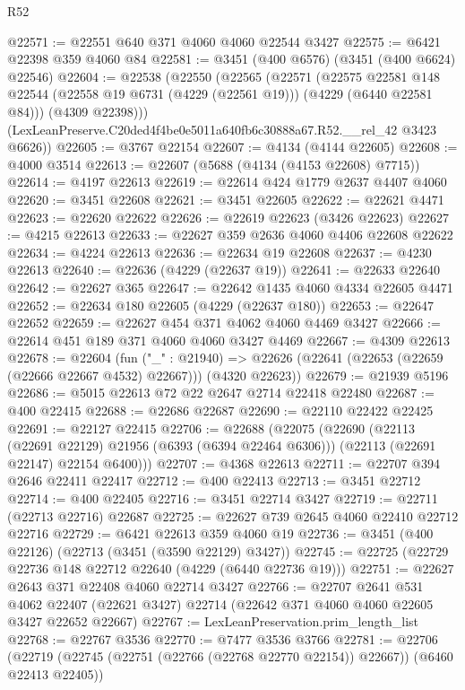 \begin{lexlean}{R52}
\begin{coremodule}
@22571 := @22551 @640 @371 @4060 @4060 @22544 @3427
@22575 := @6421 @22398 @359 @4060 @84
@22581 := @3451 (@400 @6576) (@3451 (@400 @6624) @22546)
@22604 := @22538
    (@22550
      (@22565
        (@22571
          (@22575
            @22581
            @148
            @22544
            (@22558 @19 @6731 (@4229 (@22561 @19)))
            (@4229 (@6440 @22581 @84)))
          (@4309 @22398)))
      (LexLeanPreserve.C20ded4f4be0e5011a640fb6c30888a67.R52.__rel_42 @3423 @6626))
@22605 := @3767 @22154
@22607 := @4134 (@4144 @22605)
@22608 := @4000 @3514
@22613 := @22607 (@5688 (@4134 (@4153 @22608) @7715))
@22614 := @4197 @22613
@22619 := @22614 @424 @1779 @2637 @4407 @4060
@22620 := @3451 @22608
@22621 := @3451 @22605
@22622 := @22621 @4471
@22623 := @22620 @22622
@22626 := @22619 @22623 (@3426 @22623)
@22627 := @4215 @22613
@22633 := @22627 @359 @2636 @4060 @4406 @22608 @22622
@22634 := @4224 @22613
@22636 := @22634 @19 @22608
@22637 := @4230 @22613
@22640 := @22636 (@4229 (@22637 @19))
@22641 := @22633 @22640
@22642 := @22627 @365
@22647 := @22642 @1435 @4060 @4334 @22605 @4471
@22652 := @22634 @180 @22605 (@4229 (@22637 @180))
@22653 := @22647 @22652
@22659 := @22627 @454 @371 @4062 @4060 @4469 @3427
@22666 := @22614 @451 @189 @371 @4060 @4060 @3427 @4469
@22667 := @4309 @22613
@22678 := @22604
    (fun ("_" : @21940) =>
    @22626 (@22641 (@22653 (@22659 (@22666 @22667 @4532) @22667))) (@4320 @22623))
@22679 := @21939 @5196
@22686 := @5015 @22613 @72 @22 @2647 @2714 @22418 @22480
@22687 := @400 @22415
@22688 := @22686 @22687
@22690 := @22110 @22422 @22425
@22691 := @22127 @22415
@22706 := @22688
    (@22075
      (@22690
        (@22113 (@22691 @22129) @21956 (@6393 (@6394 @22464 @6306)))
        (@22113 (@22691 @22147) @22154 @6400)))
@22707 := @4368 @22613
@22711 := @22707 @394 @2646 @22411 @22417
@22712 := @400 @22413
@22713 := @3451 @22712
@22714 := @400 @22405
@22716 := @3451 @22714 @3427
@22719 := @22711 (@22713 @22716) @22687
@22725 := @22627 @739 @2645 @4060 @22410 @22712 @22716
@22729 := @6421 @22613 @359 @4060 @19
@22736 := @3451 (@400 @22126) (@22713 (@3451 (@3590 @22129) @3427))
@22745 := @22725 (@22729 @22736 @148 @22712 @22640 (@4229 (@6440 @22736 @19)))
@22751 := @22627 @2643 @371 @22408 @4060 @22714 @3427
@22766 := @22707
    @2641
    @531
    @4062
    @22407
    (@22621 @3427)
    @22714
    (@22642 @371 @4060 @4060 @22605 @3427 @22652 @22667)
@22767 := LexLeanPreservation.prim_length_list
@22768 := @22767 @3536
@22770 := @7477 @3536 @3766
@22781 := @22706
    (@22719 (@22745 (@22751 (@22766 (@22768 @22770 @22154)) @22667)) (@6460 @22413 @22405))

\end{coremodule}
\end{lexlean}

